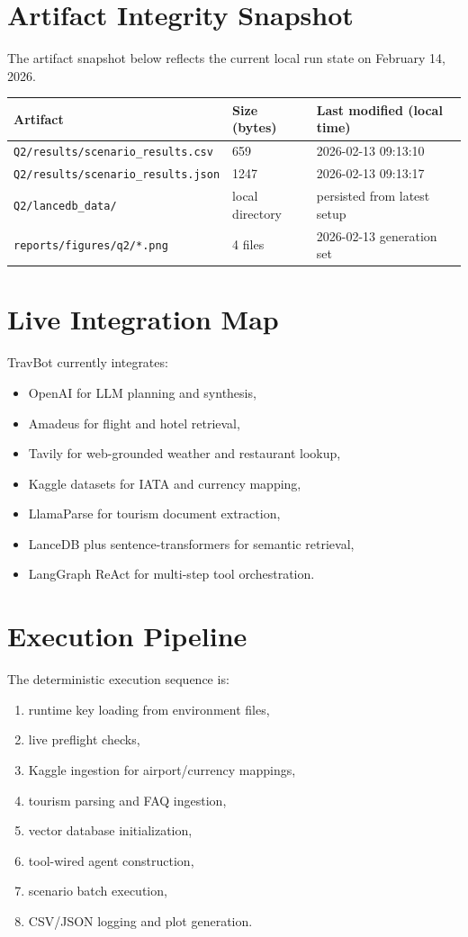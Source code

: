 \documentclass[12pt,a4paper]{article}
\begin{document}
\section{Artifact Integrity Snapshot}
The artifact snapshot below reflects the current local run state on February 14, 2026.
\begin{longtable}{@{}p{} p{} p{}@{}}
\toprule
Artifact & Size (bytes) & Last modified (local time) \\
\midrule
\texttt{Q2/results/scenario\_results.csv} & 659 & 2026-02-13 09:13:10 \\
\texttt{Q2/results/scenario\_results.json} & 1247 & 2026-02-13 09:13:17 \\
\texttt{Q2/lancedb\_data/} & local directory & persisted from latest setup \\
\texttt{reports/figures/q2/*.png} & 4 files & 2026-02-13 generation set \\
\bottomrule
\end{longtable}

\section{Live Integration Map}
TravBot currently integrates:
\begin{itemize}
\item OpenAI for LLM planning and synthesis,
\item Amadeus for flight and hotel retrieval,
\item Tavily for web-grounded weather and restaurant lookup,
\item Kaggle datasets for IATA and currency mapping,
\item LlamaParse for tourism document extraction,
\item LanceDB plus sentence-transformers for semantic retrieval,
\item LangGraph ReAct for multi-step tool orchestration.
\end{itemize}

\section{Execution Pipeline}
The deterministic execution sequence is:
\begin{enumerate}
\item runtime key loading from environment files,
\item live preflight checks,
\item Kaggle ingestion for airport/currency mappings,
\item tourism parsing and FAQ ingestion,
\item vector database initialization,
\item tool-wired agent construction,
\item scenario batch execution,
\item CSV/JSON logging and plot generation.
\end{enumerate}
\end{document}
